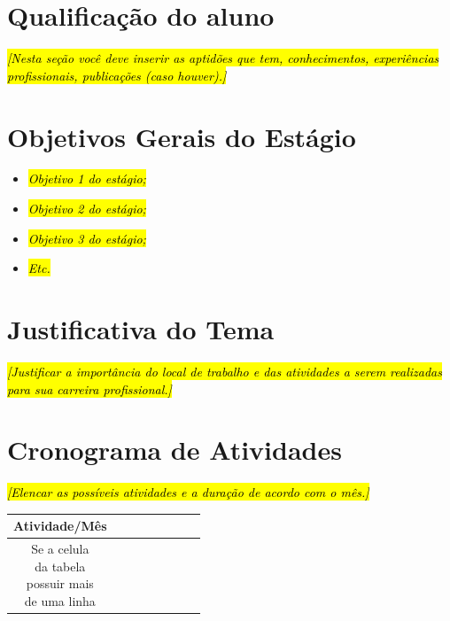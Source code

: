 \documentclass[a4paper]{article}
\begin{document}
\section*{Qualificação do aluno}

\textit{\hl{[Nesta seção você deve inserir as aptidões que tem, conhecimentos,
experiências profissionais, publicações (caso houver).]}}


\section*{Objetivos Gerais do Estágio}

\begin{itemize}
	\item \textit{\hl{Objetivo 1 do estágio;}}
	\item \textit{\hl{Objetivo 2 do estágio;}}
	\item \textit{\hl{Objetivo 3 do estágio;}}
	\item \textit{\hl{Etc.}}
\end{itemize}

\section*{Justificativa do Tema}

\textit{\hl{[Justificar a importância do local de trabalho e das atividades a serem realizadas para sua carreira profissional.]}}


\section*{Cronograma de Atividades}

\textit{\hl{[Elencar as possíveis atividades e a duração de acordo com o mês.]}}\\

\begin{tabular}{|c|c|c|c|c|c|c|c|}
	\hline
	\textbf{Atividade/Mês} &  &  &  &  &  &  &  \\
	\hline
	\makecell[l]{Se a celula\\ da tabela\\ possuir mais\\ de uma linha}&  &  &  &  &  &  &  \\
	\hline
\end{tabular}
\end{document}
